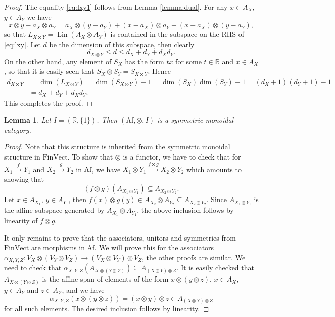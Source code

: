 \documentclass[12pt]{article}
\newtheorem{lemma}{Lemma}
\theoremstyle{definition}
\theoremstyle{remark}
\def\lin{\operatorname{Lin}}
\def \Af{\mathrm{Af}}
\def \FV{\mathrm{FinVect}}
\begin{document}
\begin{proof} The equality \eqref{eq:lxy1} follows from Lemma \ref{lemma:dual}. For any $x\in A_X$, $y\in A_Y$
 we have
\[
x\otimes y-a_X\otimes a_Y=a_X\otimes (y-a_Y)+(x-a_X)\otimes a_Y+(x-a_X)\otimes (y-a_Y),
\]
so that $L_{X\otimes Y}=\lin(A_X\otimes A_Y)$ is contained in the subspace on the RHS of \eqref{eq:lxy}.
Let $d$ be the dimension of this subspace, then clearly
\[
d_{X\otimes Y}\le d\le d_X+d_Y+d_Xd_Y.
\]
On the other hand, any element of $S_X$ has the form $tx$ for some $t\in \mathbb R$ and
$x\in A_X$, so that it is easily seen that $S_X\otimes S_Y=S_{X\otimes Y}$. 
Hence 
\begin{align*}
d_{X\otimes Y}&=\dim(L_{X\otimes Y})=\dim(S_{X\otimes
Y})-1=\dim(S_X)\dim(S_Y)-1=(d_X+1)(d_Y+1)-1\\
&=d_X+d_Y+d_Xd_Y.
\end{align*}
This completes the proof.

\end{proof}




\begin{lemma}\label{lemma:monoidal} Let $I=(\mathbb R,\{1\})$. Then 
$(\Af,\otimes, I)$ is a symmetric monoidal category.
\end{lemma}

\begin{proof} Note that this structure is inherited from the symmetric monoidal structure
in $\FV$. To show that $\otimes$ is a functor, we have to check that for $X_1\xrightarrow{f} Y_1$ and $X_2\xrightarrow{g} Y_2$ in
$\Af$, we have $X_1\otimes Y_1\xrightarrow{f\otimes g} X_2\otimes Y_2$ which amounts to
showing that 
\[
(f\otimes g)(A_{X_1\otimes Y_1})\subseteq A_{X_2\otimes Y_2}.
\]
Let $x\in A_{X_1}$, $y\in A_{Y_1}$, then $f(x)\otimes g(y)\in A_{X_2}\otimes
A_{Y_2}\subseteq A_{X_2\otimes Y_2}$. Since  $A_{X_1\otimes Y_1}$ is the affine subspace
generated by $A_{X_1}\otimes A_{Y_1}$, the above inclusion follows by linearity of $f\otimes
g$. 

It only remains to prove that the associators, unitors and symmetries from
$\FV$ are morphisms in $\Af$. We will prove this for the associators $\alpha_{X,Y,Z}:V_X\otimes (V_Y\otimes V_Z)\to
(V_X\otimes V_Y)\otimes V_Z$, the other proofs are similar. We need to check that
$\alpha_{X,Y,Z}(A_{X\otimes(Y\otimes Z)})\subseteq A_{(X\otimes Y)\otimes Z}$. It is easily
checked that $A_{X\otimes(Y\otimes Z)}$ is the affine span of elements of the form
$x\otimes (y\otimes z)$, $x\in A_X$, $y\in A_Y$ and $z\in A_Z$, and we have
\[
\alpha_{X,Y,Z}(x\otimes (y\otimes z))=(x\otimes y)\otimes z\in A_{(X\otimes Y)\otimes Z}
\]
for all such elements. The desired inclusion follows by linearity.

\end{proof}
\end{document}
